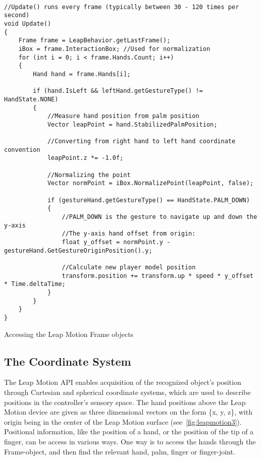\begin{table}
\label{table:annotation_visibility_code}
\lstset{style=csharp}
\begin{lstlisting}

//Update() runs every frame (typically between 30 - 120 times per second)
void Update()
{
    Frame frame = LeapBehavior.getLastFrame();
    iBox = frame.InteractionBox; //Used for normalization
    for (int i = 0; i < frame.Hands.Count; i++)
    {
        Hand hand = frame.Hands[i]; 

        if (hand.IsLeft && leftHand.getGestureType() != HandState.NONE)
        {
            //Measure hand position from palm position
            Vector leapPoint = hand.StabilizedPalmPosition;
            
            //Converting from right hand to left hand coordinate convention
            leapPoint.z *= -1.0f; 

            //Normalizing the point
            Vector normPoint = iBox.NormalizePoint(leapPoint, false);
            
            if (gestureHand.getGestureType() == HandState.PALM_DOWN) 
            {
                //PALM_DOWN is the gesture to navigate up and down the y-axis          
                //The y-axis hand offset from origin:
                float y_offset = normPoint.y - gestureHand.GetGestureOriginPosition().y;

                //Calculate new player model position
                transform.position += transform.up * speed * y_offset * Time.deltaTime;
            }             
        }
    }
}
\end{lstlisting}
\caption[Accessing the Leap Motion Frame objects]{Accessing the Leap Motion Frame objects}
\end{table}

\subsection{The Coordinate System}
The Leap Motion API enables acquisition of the recognized object's position through Cartesian and spherical coordinate systems, 
which are used to describe positions in the controller's sensory space. The hand positions above the Leap Motion device are given as three dimensional
vectors on the form \{x, y, z\}, with origin being in the center of the Leap Motion surface (see~\vref{fig:leapmotion3}).  
Positional information, like the position of a hand, or the position of the tip of a finger, can be access in various ways. One way is to access the hands through the
Frame-object, and then find the relevant hand, palm, finger or finger-joint.

